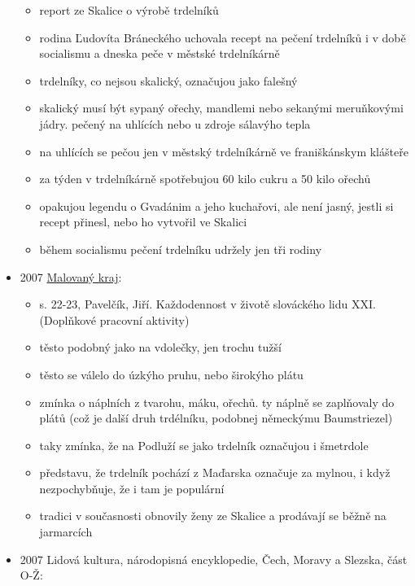\begin{itemize}
  \begin{itemize}
  \tightlist
  \item
    report ze Skalice o výrobě trdelníků
  \item
    rodina Ľudovíta Bráneckého uchovala recept na pečení trdelníků i v
    době socialismu a dneska peče v městské trdelníkárně
  \item
    trdelníky, co nejsou skalický, označujou jako falešný
  \item
    skalický musí být sypaný ořechy, mandlemi nebo sekanými meruňkovými
    jádry. pečený na uhlících nebo u zdroje sálavýho tepla
  \item
    na uhlících se pečou jen v městský trdelníkárně ve franiškánskym
    klášteře
  \item
    za týden v trdelníkárně spotřebujou 60 kilo cukru a 50 kilo ořechů
  \item
    opakujou legendu o Gvadánim a jeho kuchařovi, ale není jasný, jestli
    si recept přinesl, nebo ho vytvořil ve Skalici
  \item
    během socialismu pečení trdelníku udržely jen tři rodiny
  \end{itemize}
\item
  2007
  \href{https://ceskadigitalniknihovna.cz/uuid/uuid:889f61a0-f31b-11e3-97c9-001018b5eb5c}{Malovaný
  kraj}:

  \begin{itemize}
  \tightlist
  \item
    s. 22-23, Pavelčík, Jiří. Každodennost v životě slováckého lidu XXI.
    (Doplňkové pracovní aktivity)
  \item
    těsto podobný jako na vdolečky, jen trochu tužší
  \item
    těsto se válelo do úzkýho pruhu, nebo širokýho plátu
  \item
    zmínka o náplních z tvarohu, máku, ořechů. ty náplně se zaplňovaly
    do plátů (což je další druh trdélníku, podobnej německýmu
    Baumstriezel)
  \item
    taky zmínka, že na Podluží se jako trdelník označujou i šmetrdole
  \item
    představu, že trdelník pochází z Maďarska označuje za mylnou, i když
    nezpochybňuje, že i tam je populární
  \item
    tradici v současnosti obnovily ženy ze Skalice a prodávají se běžně
    na jarmarcích
  \end{itemize}
\item
  2007 Lidová kultura, národopisná encyklopedie, Čech, Moravy a Slezska,
  část O-Ž:


\end{itemize}
